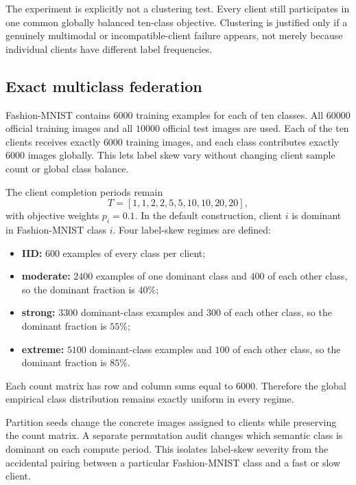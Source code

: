 The experiment is explicitly not a clustering test. Every client still participates in one common globally balanced ten-class objective. Clustering is justified only if a genuinely multimodal or incompatible-client failure appears, not merely because individual clients have different label frequencies.

\subsection{Exact multiclass federation}

Fashion-MNIST contains $6000$ training examples for each of ten classes. All $60000$ official training images and all $10000$ official test images are used. Each of the ten clients receives exactly $6000$ training images, and each class contributes exactly $6000$ images globally. This lets label skew vary without changing client sample count or global class balance.

The client completion periods remain
\begin{equation}
T=[1,1,2,2,5,5,10,10,20,20],
\end{equation}
with objective weights $p_i=0.1$. In the default construction, client $i$ is dominant in Fashion-MNIST class $i$. Four label-skew regimes are defined:
\begin{itemize}
    \item \textbf{IID:} $600$ examples of every class per client;
    \item \textbf{moderate:} $2400$ examples of one dominant class and $400$ of each other class, so the dominant fraction is $40\%$;
    \item \textbf{strong:} $3300$ dominant-class examples and $300$ of each other class, so the dominant fraction is $55\%$;
    \item \textbf{extreme:} $5100$ dominant-class examples and $100$ of each other class, so the dominant fraction is $85\%$.
\end{itemize}
Each count matrix has row and column sums equal to $6000$. Therefore the global empirical class distribution remains exactly uniform in every regime.

Partition seeds change the concrete images assigned to clients while preserving the count matrix. A separate permutation audit changes which semantic class is dominant on each compute period. This isolates label-skew severity from the accidental pairing between a particular Fashion-MNIST class and a fast or slow client.

